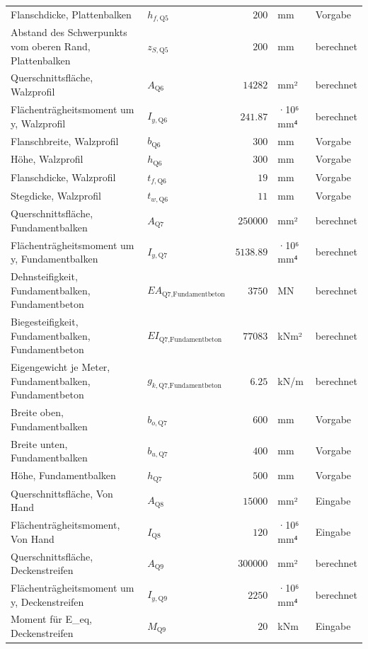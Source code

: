 \documentclass[11pt,a4paper]{article}
\begin{document}
\begin{xltabular}{\linewidth}{>{\raggedright\arraybackslash}Xlrll}
Flanschdicke, Plattenbalken & $h_{f,\text{Q5}}$ & $200$ & mm & Vorgabe \\
Abstand des Schwerpunkts vom oberen Rand, Plattenbalken & $z_{S,\text{Q5}}$ & $200$ & mm & berechnet \\
Querschnittsfläche, Walzprofil & $A_{\text{Q6}}$ & $14282$ & mm² & berechnet \\
Flächenträgheitsmoment um y, Walzprofil & $I_{y,\text{Q6}}$ & $241.87$ & ·10⁶ mm⁴ & berechnet \\
Flanschbreite, Walzprofil & $b_{\text{Q6}}$ & $300$ & mm & Vorgabe \\
Höhe, Walzprofil & $h_{\text{Q6}}$ & $300$ & mm & Vorgabe \\
Flanschdicke, Walzprofil & $t_{f,\text{Q6}}$ & $19$ & mm & Vorgabe \\
Stegdicke, Walzprofil & $t_{w,\text{Q6}}$ & $11$ & mm & Vorgabe \\
Querschnittsfläche, Fundamentbalken & $A_{\text{Q7}}$ & $250000$ & mm² & berechnet \\
Flächenträgheitsmoment um y, Fundamentbalken & $I_{y,\text{Q7}}$ & $5138.89$ & ·10⁶ mm⁴ & berechnet \\
Dehnsteifigkeit, Fundamentbalken, Fundamentbeton & $EA_{\text{Q7,Fundamentbeton}}$ & $3750$ & MN & berechnet \\
Biegesteifigkeit, Fundamentbalken, Fundamentbeton & $EI_{\text{Q7,Fundamentbeton}}$ & $77083$ & kNm² & berechnet \\
Eigengewicht je Meter, Fundamentbalken, Fundamentbeton & $g_{k,\text{Q7,Fundamentbeton}}$ & $6.25$ & kN/m & berechnet \\
Breite oben, Fundamentbalken & $b_{o,\text{Q7}}$ & $600$ & mm & Vorgabe \\
Breite unten, Fundamentbalken & $b_{u,\text{Q7}}$ & $400$ & mm & Vorgabe \\
Höhe, Fundamentbalken & $h_{\text{Q7}}$ & $500$ & mm & Vorgabe \\
Querschnittsfläche, Von Hand & $A_{\text{Q8}}$ & $15000$ & mm² & Eingabe \\
Flächenträgheitsmoment, Von Hand & $I_{\text{Q8}}$ & $120$ & ·10⁶ mm⁴ & Eingabe \\
Querschnittsfläche, Deckenstreifen & $A_{\text{Q9}}$ & $300000$ & mm² & berechnet \\
Flächenträgheitsmoment um y, Deckenstreifen & $I_{y,\text{Q9}}$ & $2250$ & ·10⁶ mm⁴ & berechnet \\
Moment für E\_eq, Deckenstreifen & $M_{\text{Q9}}$ & $20$ & kNm & Eingabe \\

\end{xltabular}
\end{document}

